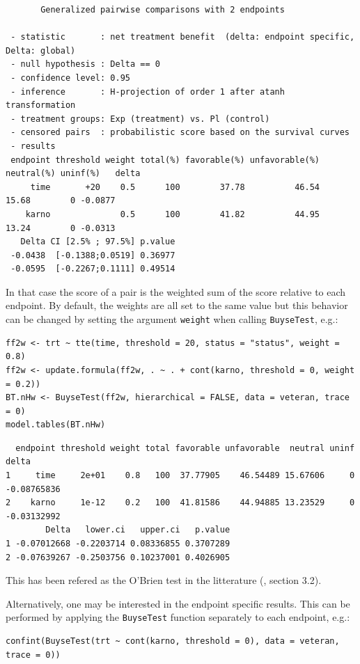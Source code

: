 \documentclass[12pt]{article}
\begin{document}
\begin{verbatim}
       Generalized pairwise comparisons with 2 endpoints

 - statistic       : net treatment benefit  (delta: endpoint specific, Delta: global) 
 - null hypothesis : Delta == 0 
 - confidence level: 0.95 
 - inference       : H-projection of order 1 after atanh transformation 
 - treatment groups: Exp (treatment) vs. Pl (control) 
 - censored pairs  : probabilistic score based on the survival curves
 - results
 endpoint threshold weight total(%) favorable(%) unfavorable(%) neutral(%) uninf(%)   delta
     time       +20    0.5      100        37.78          46.54      15.68        0 -0.0877
    karno              0.5      100        41.82          44.95      13.24        0 -0.0313
   Delta CI [2.5% ; 97.5%] p.value 
 -0.0438  [-0.1388;0.0519] 0.36977 
 -0.0595  [-0.2267;0.1111] 0.49514
\end{verbatim}

In that case the score of a pair is the weighted sum of the score
relative to each endpoint. By default, the weights are all set to the
same value but this behavior can be changed by setting the argument
\texttt{weight} when calling \texttt{BuyseTest}, e.g.:
\lstset{language=r,label= ,caption= ,captionpos=b,numbers=none}
\begin{lstlisting}
ff2w <- trt ~ tte(time, threshold = 20, status = "status", weight = 0.8)
ff2w <- update.formula(ff2w, . ~ . + cont(karno, threshold = 0, weight = 0.2))
BT.nHw <- BuyseTest(ff2w, hierarchical = FALSE, data = veteran, trace = 0)
model.tables(BT.nHw)
\end{lstlisting}

\begin{verbatim}
  endpoint threshold weight total favorable unfavorable  neutral uninf       delta
1     time     2e+01    0.8   100  37.77905    46.54489 15.67606     0 -0.08765836
2    karno     1e-12    0.2   100  41.81586    44.94885 13.23529     0 -0.03132992
        Delta   lower.ci   upper.ci   p.value
1 -0.07012668 -0.2203714 0.08336855 0.3707289
2 -0.07639267 -0.2503756 0.10237001 0.4026905
\end{verbatim}


This has been refered as the O’Brien test in the litterature
(\cite{verbeeck2019generalized}, section 3.2).

\clearpage

Alternatively, one may be interested in the endpoint
specific results. This can be performed by applying the \texttt{BuyseTest}
function separately to each endpoint, e.g.:
\lstset{language=r,label= ,caption= ,captionpos=b,numbers=none}
\begin{lstlisting}
confint(BuyseTest(trt ~ cont(karno, threshold = 0), data = veteran, trace = 0))
\end{lstlisting}
\end{document}
